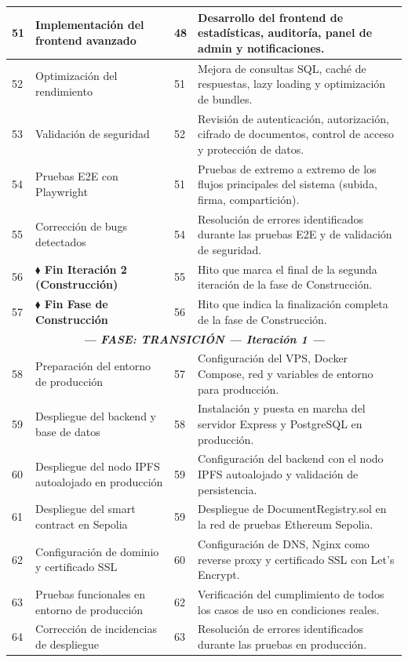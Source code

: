\documentclass[11pt, a4paper]{article}
\begin{document}
\begin{longtable}{|p{1cm}|p{5.5cm}|p{1.5cm}|p{5.5cm}|}
\hline
51 & Implementación del frontend avanzado & 48 & Desarrollo del frontend de estadísticas, auditoría, panel de admin y notificaciones. \\
\hline
52 & Optimización del rendimiento & 51 & Mejora de consultas SQL, caché de respuestas, lazy loading y optimización de bundles. \\
\hline
53 & Validación de seguridad & 52 & Revisión de autenticación, autorización, cifrado de documentos, control de acceso y protección de datos. \\
\hline
54 & Pruebas E2E con Playwright & 51 & Pruebas de extremo a extremo de los flujos principales del sistema (subida, firma, compartición). \\
\hline
55 & Corrección de bugs detectados & 54 & Resolución de errores identificados durante las pruebas E2E y de validación de seguridad. \\
\hline
56 & \textbf{$\blacklozenge$ Fin Iteración 2 (Construcción)} & 55 & Hito que marca el final de la segunda iteración de la fase de Construcción. \\
\hline
57 & \textbf{$\blacklozenge$ Fin Fase de Construcción} & 56 & Hito que indica la finalización completa de la fase de Construcción. \\
\hline
\multicolumn{4}{|c|}{\textit{\textbf{--- FASE: TRANSICIÓN --- Iteración 1 ---}}} \\
\hline
58 & Preparación del entorno de producción & 57 & Configuración del VPS, Docker Compose, red y variables de entorno para producción. \\
\hline
59 & Despliegue del backend y base de datos & 58 & Instalación y puesta en marcha del servidor Express y PostgreSQL en producción. \\
\hline
60 & Despliegue del nodo IPFS autoalojado en producción & 59 & Configuración del backend con el nodo IPFS autoalojado y validación de persistencia. \\
\hline
61 & Despliegue del smart contract en Sepolia & 59 & Despliegue de DocumentRegistry.sol en la red de pruebas Ethereum Sepolia. \\
\hline
62 & Configuración de dominio y certificado SSL & 60 & Configuración de DNS, Nginx como reverse proxy y certificado SSL con Let's Encrypt. \\
\hline
63 & Pruebas funcionales en entorno de producción & 62 & Verificación del cumplimiento de todos los casos de uso en condiciones reales. \\
\hline
64 & Corrección de incidencias de despliegue & 63 & Resolución de errores identificados durante las pruebas en producción. \\

\end{longtable}
\end{document}
